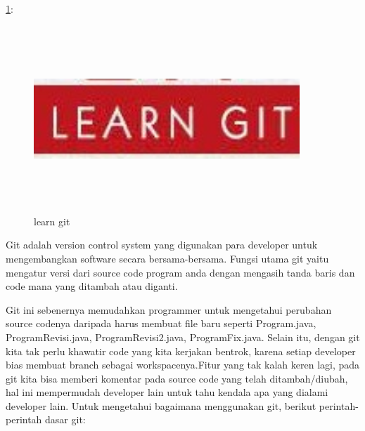\ref{git.jpg}:
\begin{figure}[ht]
	\centerline{\includegraphics[width=10cm,height=7cm]{Figures/pic.jpg}}
	\caption{learn git}
	\label{git.jpg}
\end{figure}

Git adalah version control system yang digunakan para developer untuk 
mengembangkan software secara bersama-bersama. Fungsi utama git yaitu 
mengatur versi dari source code program anda dengan mengasih tanda baris 
dan code mana yang ditambah atau diganti.
\vspace{12pt}

Git ini sebenernya memudahkan programmer untuk mengetahui perubahan 
source codenya daripada harus membuat file baru seperti Program.java, 
ProgramRevisi.java, ProgramRevisi2.java, ProgramFix.java. Selain itu, 
dengan git kita tak perlu khawatir code yang kita kerjakan bentrok, 
karena setiap developer bias membuat branch sebagai workspacenya.Fitur 
yang tak kalah keren lagi, pada git kita bisa memberi komentar pada 
source code yang telah ditambah/diubah, hal ini mempermudah developer 
lain untuk tahu kendala apa yang dialami developer lain.
\vspace{12pt}
Untuk mengetahui bagaimana menggunakan git, berikut perintah-perintah 
dasar git:

